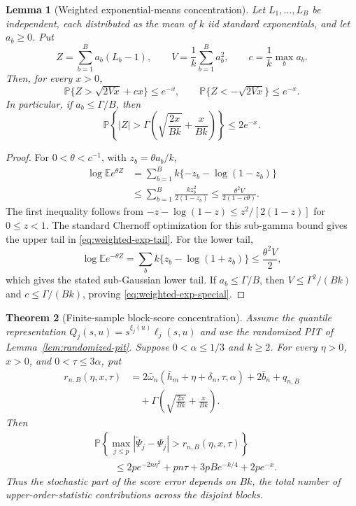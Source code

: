 \documentclass[11pt]{article}
\newtheorem{theorem}{Theorem}[section]
\newtheorem{lemma}[theorem]{Lemma}
\theoremstyle{definition}\newtheorem{definition}[theorem]{Definition}
\newcommand{\Pp}{\mathbb P}
\newcommand{\E}{\mathbb E}
\begin{document}
\begin{lemma}[Weighted exponential-means concentration]
\label{lem:weighted-exp}
Let $L_1,\ldots,L_B$ be independent, each distributed as the mean of $k$ iid
standard exponentials, and let $a_b\ge0$.  Put
\[
 Z=\sum_{b=1}^B a_b(L_b-1),
 \qquad
 V=\frac1k\sum_{b=1}^B a_b^2,
 \qquad
 c=\frac1k\max_ba_b.
\]
Then, for every $x>0$,
\begin{equation}
 \Pp\{Z>\sqrt{2Vx}+cx\}\le e^{-x},
 \qquad
 \Pp\{Z<-\sqrt{2Vx}\}\le e^{-x}.
 \label{eq:weighted-exp-tail}
\end{equation}
In particular, if $a_b\le\Gamma/B$, then
\begin{equation}
 \Pp\left\{|Z|>
 \Gamma\left(\sqrt{\frac{2x}{Bk}}+\frac{x}{Bk}\right)\right\}
 \le2e^{-x}.
 \label{eq:weighted-exp-special}
\end{equation}
\end{lemma}

\begin{proof}
For $0<\theta<c^{-1}$, with $z_b=\theta a_b/k$,
\begin{align*}
 \log\E e^{\theta Z}
 &=\sum_{b=1}^B k\{-z_b-\log(1-z_b)\}\\
 &\le\sum_{b=1}^B\frac{kz_b^2}{2(1-z_b)}
 \le\frac{\theta^2V}{2(1-c\theta)}.
\end{align*}
The first inequality follows from
$-z-\log(1-z)\le z^2/[2(1-z)]$ for $0\le z<1$.
The standard Chernoff optimization for this sub-gamma bound gives the upper
tail in \eqref{eq:weighted-exp-tail}.  For the lower tail,
\[
 \log\E e^{-\theta Z}
 =\sum_bk\{z_b-\log(1+z_b)\}
 \le\frac{\theta^2V}{2},
\]
which gives the stated sub-Gaussian lower tail.  If $a_b\le\Gamma/B$, then
$V\le\Gamma^2/(Bk)$ and $c\le\Gamma/(Bk)$, proving
\eqref{eq:weighted-exp-special}.
\end{proof}

\begin{theorem}[Finite-sample block-score concentration]
\label{thm:block-finite}
Assume the quantile representation
$Q_j(s,u)=s^{\xi_j(u)}\ell_j(s,u)$ and use the randomized PIT of
Lemma~\ref{lem:randomized-pit}.  Suppose $0<\alpha\le1/3$ and $k\ge2$.
For every $\eta>0$, $x>0$, and $0<\tau\le3\alpha$, put
\begin{align}
 r_{n,B}(\eta,x,\tau)
 &=2\bar\omega_n(\bar h_m+\eta+\delta_n,\tau,\alpha)
   +2\bar b_n+q_{n,B}
 \nonumber\\
 &\quad+\Gamma\left(\sqrt{\frac{2x}{Bk}}+\frac{x}{Bk}\right).
 \label{eq:block-radius}
\end{align}
Then
\begin{align}
 &\Pp\left\{\max_{j\le p}
 |\widetilde\Psi_j-\Psi_j|>r_{n,B}(\eta,x,\tau)\right\}
 \nonumber\\
 &\qquad\le
 2pe^{-2n\eta^2}+pn\tau+3pB e^{-k/4}+2pe^{-x}.
 \label{eq:block-finite-bound}
\end{align}
Thus the stochastic part of the score error depends on $Bk$, the total number
of upper-order-statistic contributions across the disjoint blocks.
\end{theorem}
\end{document}
